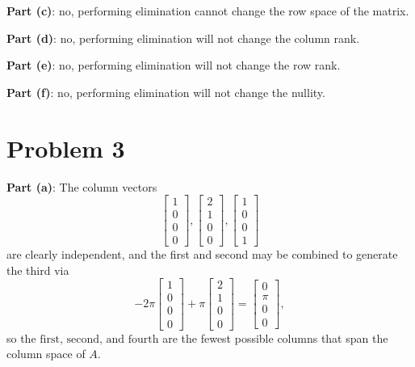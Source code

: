 \documentclass[11pt]{article}
\begin{document}
\textbf{Part (c)}: $\boxed{\text{no}}$, performing elimination cannot change the row space of the matrix.

\textbf{Part (d)}: $\boxed{\text{no}}$, performing elimination will not change the column rank.

\textbf{Part (e)}: $\boxed{\text{no}}$, performing elimination will not change the row rank.

\textbf{Part (f)}: $\boxed{\text{no}}$, performing elimination will not change the nullity.


\section{Problem 3}

\textbf{Part (a)}: The column vectors
\[
	\begin{bmatrix} 1 \\ 0 \\ 0 \\ 0 \end{bmatrix}, \begin{bmatrix} 2 \\ 1 \\ 0 \\ 0 \end{bmatrix}, \begin{bmatrix} 1 \\ 0 \\ 0 \\ 1 \end{bmatrix}
\]
are clearly independent, and the first and second may be combined to generate the third via 
\[
	-2 \pi \begin{bmatrix} 1 \\ 0 \\ 0 \\ 0 \end{bmatrix} + \pi \begin{bmatrix} 2 \\ 1 \\ 0 \\ 0 \end{bmatrix} = \begin{bmatrix} 0 \\ \pi \\ 0 \\ 0 \end{bmatrix},
\]
so the $\boxed{\text{first, second, and fourth}}$ are the fewest possible columns that span the column space of $A$.
\end{document}
